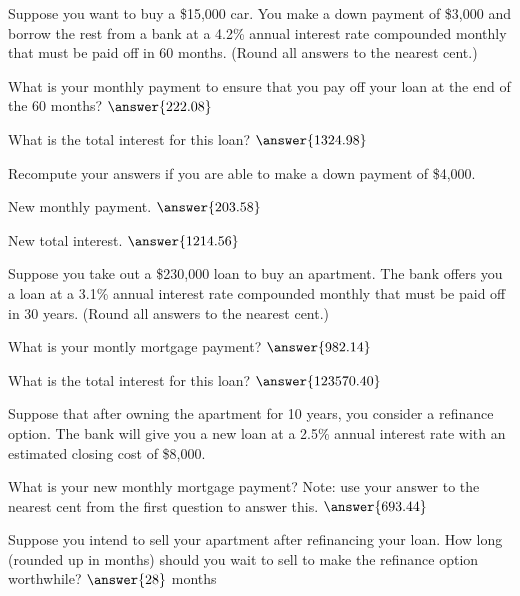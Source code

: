 \documentclass{ximera}
\begin{document}
\begin{question}
Suppose you want to buy a \$15,000 car. You make a down payment of \$3,000 and borrow the rest from a bank at a 4.2\% annual interest rate compounded monthly that must be paid off in 60 months. (Round all answers to the nearest cent.)
	
What is your monthly payment to ensure that you pay off your loan at the end of the 60 months? $\answer{222.08}$

What is the total interest for this loan? $\answer{1324.98}$

Recompute your answers if you are able to make a down payment of \$4,000.

New monthly payment. $\answer{203.58}$

New total interest. $\answer{1214.56}$
\end{question}

\begin{question}
	Suppose you take out a \$230,000 loan to buy an apartment. The bank offers you a loan at a 3.1\% annual interest rate compounded monthly that must be paid off in 30 years. (Round all answers to the nearest cent.)

What is your montly mortgage payment? $\answer{982.14}$

What is the total interest for this loan? $\answer{123570.40}$

Suppose that after owning the apartment for 10 years, you consider a refinance option. The bank will give you a new loan at a 2.5\% annual interest rate with an estimated closing cost of \$8,000.

What is your new monthly mortgage payment? Note: use your answer to the nearest cent from the first question to answer this. $\answer{693.44}$

Suppose you intend to sell your apartment after refinancing your loan. How long (rounded up in months) should you wait to sell to make the refinance option worthwhile? $\answer{28}$ months
\end{question}
\end{document}

